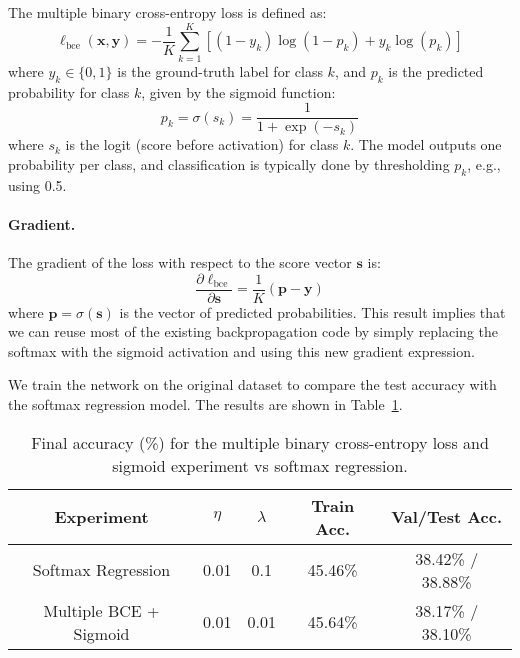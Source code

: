 \documentclass{article}
\begin{document}
The multiple binary cross-entropy loss is defined as:
\[
\ell_{\text{bce}}(\mathbf{x}, \mathbf{y}) = -\frac{1}{K} \sum_{k=1}^{K} \left[(1 - y_k) \log(1 - p_k) + y_k \log(p_k)\right]
\]
where \( y_k \in \{0, 1\} \) is the ground-truth label for class \(k\), and \( p_k \) is the predicted probability for class \(k\), given by the sigmoid function:
\[
p_k = \sigma(s_k) = \frac{1}{1 + \exp(-s_k)}
\]
where \( s_k \) is the logit (score before activation) for class \(k\). The model outputs one probability per class, and classification is typically done by thresholding \( p_k \), e.g., using 0.5.

\paragraph{Gradient.} The gradient of the loss with respect to the score vector \( \mathbf{s} \) is:
\[
\frac{\partial \ell_{\text{bce}}}{\partial \mathbf{s}} = \frac{1}{K} \left( \boldsymbol{p} - \mathbf{y} \right)
\]
where \( \boldsymbol{p} = \sigma(\mathbf{s}) \) is the vector of predicted probabilities. This result implies that we can reuse most of the existing backpropagation code by simply replacing the softmax with the sigmoid activation and using this new gradient expression.


We train the network on the original dataset to compare the test accuracy with the softmax regression model. The results are shown in Table~\ref{tab:experiment_results_bce}.

\begin{table}[h!]
    \centering
    \caption{Final accuracy (\%) for the multiple binary cross-entropy loss and sigmoid experiment vs softmax regression.}
    \label{tab:experiment_results_bce}

    \begin{tabular}{|c|c|c|c|c|}
        \hline
        \textbf{Experiment} & \boldmath$\eta$ & \boldmath$\lambda$ & \textbf{Train Acc.} & \textbf{Val/Test Acc.} \\
        \hline
        Softmax Regression   & 0.01 & 0.1 & 45.46\% & 38.42\% / 38.88\% \\
        Multiple BCE + Sigmoid & 0.01 & 0.01 & 45.64\% & 38.17\% / 38.10\% \\
        \hline
    \end{tabular}
\end{table}
\end{document}
